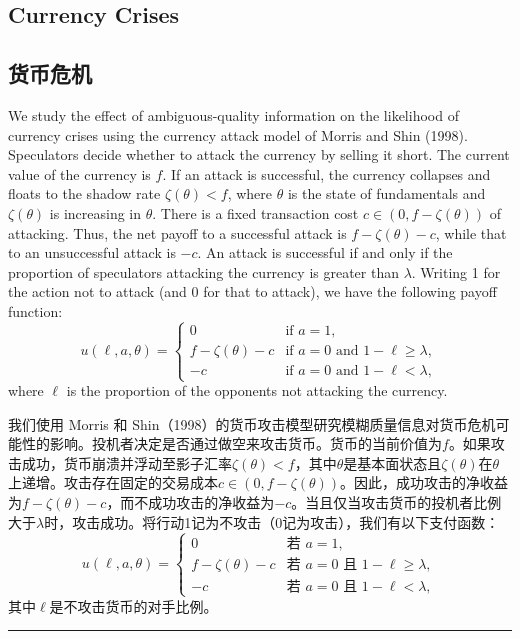 \documentclass[12pt,a4paper]{article}
\newenvironment{original}
  {\par\medskip\noindent\color{black}\ignorespaces}
  {\par\medskip}
\newenvironment{translation}
  {\par\noindent\color{darkblue}\ignorespaces}
  {\par\medskip\noindent\hrule\par\medskip}
\theoremstyle{definition}
\theoremstyle{remark}
\begin{document}
\subsection*{Currency Crises}
\subsection*{\color{darkblue}货币危机}

\begin{original}
We study the effect of ambiguous-quality information on the likelihood of currency crises using the currency attack model of Morris and Shin (1998). Speculators decide whether to attack the currency by selling it short. The current value of the currency is $f$. If an attack is successful, the currency collapses and floats to the shadow rate $\zeta(\theta) < f$, where $\theta$ is the state of fundamentals and $\zeta(\theta)$ is increasing in $\theta$. There is a fixed transaction cost $c \in (0, f - \zeta(\theta))$ of attacking. Thus, the net payoff to a successful attack is $f - \zeta(\theta) - c$, while that to an unsuccessful attack is $-c$. An attack is successful if and only if the proportion of speculators attacking the currency is greater than $\lambda$. Writing 1 for the action not to attack (and 0 for that to attack), we have the following payoff function:
\[
u(\ell, a, \theta) =
\begin{cases}
0 & \text{if } a = 1,\\
f - \zeta(\theta) - c & \text{if } a = 0 \text{ and } 1 - \ell \ge \lambda,\\
-c & \text{if } a = 0 \text{ and } 1 - \ell < \lambda,
\end{cases}
\]
where $\ell$ is the proportion of the opponents not attacking the currency.
\end{original}
\begin{translation}
我们使用 Morris 和 Shin（1998）的货币攻击模型研究模糊质量信息对货币危机可能性的影响。投机者决定是否通过做空来攻击货币。货币的当前价值为$f$。如果攻击成功，货币崩溃并浮动至影子汇率$\zeta(\theta) < f$，其中$\theta$是基本面状态且$\zeta(\theta)$在$\theta$上递增。攻击存在固定的交易成本$c \in (0, f - \zeta(\theta))$。因此，成功攻击的净收益为$f - \zeta(\theta) - c$，而不成功攻击的净收益为$-c$。当且仅当攻击货币的投机者比例大于$\lambda$时，攻击成功。将行动1记为不攻击（0记为攻击），我们有以下支付函数：
\[
u(\ell, a, \theta) =
\begin{cases}
0 & \text{若 } a = 1,\\
f - \zeta(\theta) - c & \text{若 } a = 0 \text{ 且 } 1 - \ell \ge \lambda,\\
-c & \text{若 } a = 0 \text{ 且 } 1 - \ell < \lambda,
\end{cases}
\]
其中$\ell$是不攻击货币的对手比例。
\end{translation}
\end{document}
